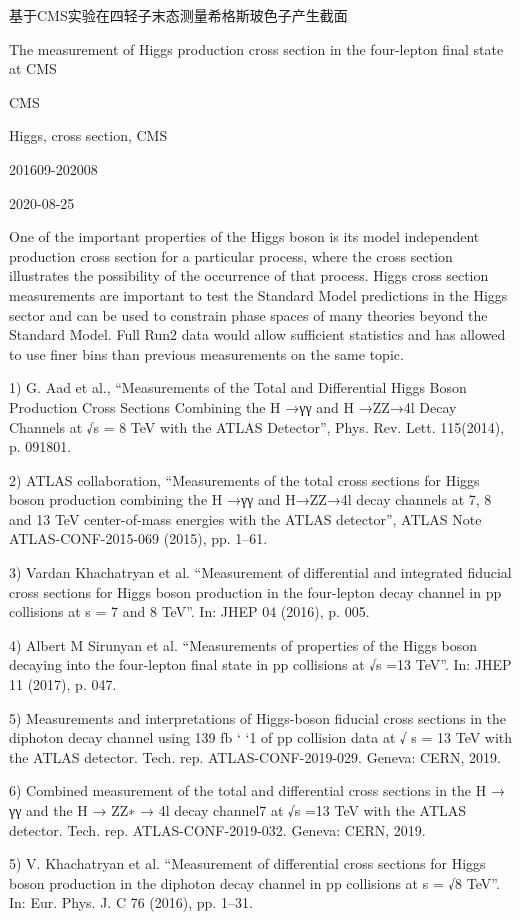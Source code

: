 基于CMS实验在四轻子末态测量希格斯玻色子产生截面

The measurement of Higgs production cross section in the four-lepton final state at CMS

CMS

Higgs, cross section, CMS

201609-202008

2020-08-25

One of the important properties of the Higgs boson is its model independent production cross section for a particular process, where the cross section illustrates the possibility of the occurrence of that process. 
Higgs cross section measurements are important to test the Standard Model predictions in the Higgs sector and can be used to constrain phase spaces of many theories beyond the Standard Model. Full Run2 data would allow sufficient statistics and has allowed to use finer bins than previous measurements on the same topic.

1) G. Aad et al., “Measurements of the Total and Differential Higgs Boson Production Cross Sections Combining the H →γγ and H →ZZ→4l Decay Channels at √s = 8 TeV with the ATLAS Detector”, Phys. Rev. Lett. 115(2014), p. 091801.

2) ATLAS collaboration, “Measurements of the total cross sections for Higgs boson production combining the H →γγ and  H→ZZ→4l decay channels at 7, 8 and 13 TeV center-of-mass energies with the ATLAS detector”, ATLAS Note ATLAS-CONF-2015-069 (2015), pp. 1–61.

3) Vardan Khachatryan et al. “Measurement of differential and integrated fiducial cross sections for Higgs boson production in the four-lepton decay channel in pp collisions at s = 7 and 8 TeV”. In: JHEP 04 (2016), p. 005.

4) Albert M Sirunyan et al. “Measurements of properties of the Higgs boson decaying into the four-lepton final state in pp collisions at √s =13 TeV”. In: JHEP 11 (2017), p. 047.

5) Measurements and interpretations of Higgs-boson fiducial cross sections in the diphoton decay channel using 139 fb ‘ ‘1 of pp collision data at √ s = 13 TeV with the ATLAS detector. Tech. rep. ATLAS-CONF-2019-029. Geneva: CERN, 2019.

6) Combined measurement of the total and differential cross sections in the H → γγ and the H → ZZ∗ → 4l decay channel7 at √s =13 TeV with the ATLAS detector. Tech. rep. ATLAS-CONF-2019-032. Geneva: CERN, 2019.

5) V. Khachatryan et al. “Measurement of differential cross sections for Higgs boson production in the diphoton decay channel in pp collisions at s = √8 TeV”. In: Eur. Phys. J. C 76 (2016), pp. 1–31.

